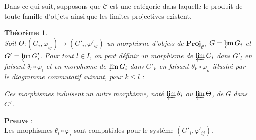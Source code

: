 \documentclass[a4paper, 14pt]{report}
\newtheorem{theorem}{Théorème}[section]
\begin{document}
\begin{onehalfspace}
{Dans ce qui suit, supposons que $\mathcal{C}$ est une catégorie dans laquelle le produit de toute famille d'objets ainsi que  les limites projectives existent.
			
			\begin{theorem}\cite{guglielmetti2025profinite} \label{prop0} \\
				Soit $\Theta : (G_i, \varphi_{ij}) \longrightarrow (G'_i, \varphi'_{ij})$ un morphisme d'objets de $\mathbf{Proj}_{\mathcal{C}}$, $G = \varprojlim G_i$ et $G' = \varprojlim G'_i$. Pour tout $l \in I$, on peut définir un morphisme de $\varprojlim G_i$ dans $G'_l$ en faisant $\theta_l \circ \varphi_l$ 
				et un morphisme de $\varprojlim G_i$ dans $G'_k$ en faisant $\theta_k \circ \varphi_k$ illustré par le diagramme commutatif suivant, pour $k \leq l$  \cite{guglielmetti2025profinite} :
				
				\begin{center}
				\end{center} Ces morphismes induisent un autre morphisme, noté $\varprojlim \theta_i$ ou $\varprojlim \Theta$, de $G$ dans $G'$. 
				
				
			\end{theorem}
			
			
			\textbf{\underline{Preuve}} : \\
Les morphismes $\theta_i \circ \varphi_i$ sont compatibles pour le système $(G'_i, \varphi'_{ij})$.
			
}
\end{onehalfspace}
\end{document}
